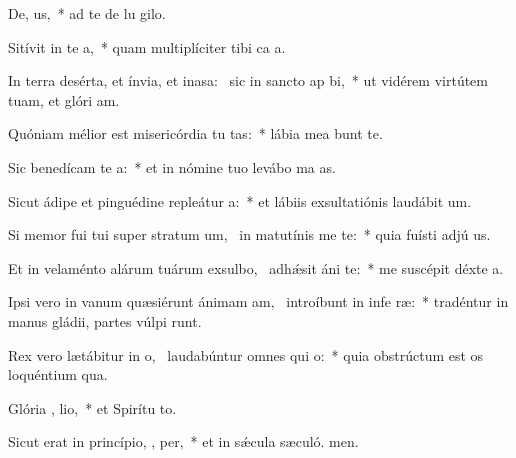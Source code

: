 \item De,  us,~* ad te de lu gilo.
\item Sitívit in te  a,~* quam multiplíciter tibi ca a.
\item In terra desérta, et ínvia, et inasa:~\pscross{} sic in sancto ap bi,~* ut vidérem virtútem tuam, et glóri am.
\item Quóniam mélior est misericórdia tu  tas:~* lábia mea bunt te.
\item Sic benedícam te   a:~* et in nómine tuo levábo ma as.
\item Sicut ádipe et pinguédine repleátur  a:~* et lábiis exsultatiónis laudábit  um.
\item Si memor fui tui super stratum um,~\pscross{} in matutínis me  te:~* quia fuísti adjú us.
\item Et in velaménto alárum tuárum exsulbo,~\pscross{} adhǽsit áni   te:~* me suscépit déxte a.
\item Ipsi vero in vanum quæsiérunt ánimam am,~\pscross{} introíbunt in infe ræ:~* tradéntur in manus gládii, partes vúlpi runt.
\item Rex vero lætábitur in o,~\pscross{} laudabúntur omnes qui   o:~* quia obstrúctum est os loquéntium qua.
\item Glória ,  lio,~* et Spirítu to.
\item Sicut erat in princípio,  ,  per,~* et in sǽcula sæculó. men.
